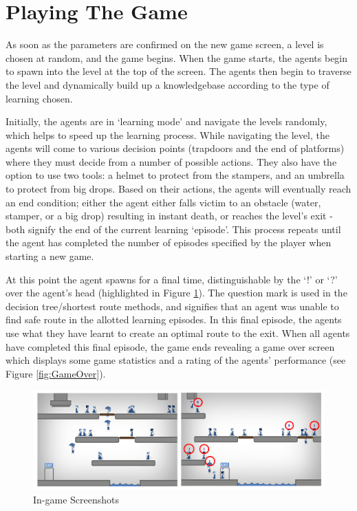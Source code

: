 \documentclass[a4paper,oneside]{report}
\begin{document}
\section{Playing The Game}

As soon as the parameters are confirmed on the new game screen, a level is chosen at random, and the game begins. When the game starts, the agents begin to spawn into the level at the top of the screen. The agents then begin to traverse the level and dynamically build up a knowledgebase according to the type of learning chosen. 

Initially, the agents are in `learning mode' and navigate the levels randomly, which helps to speed up the learning process. While navigating the level, the agents will come to various decision points (trapdoors and the end of platforms) where they must decide from a number of possible actions. They also have the option to use two tools: a helmet to protect from the stampers, and an umbrella to protect from big drops. Based on their actions, the agents will eventually reach an end condition; either the agent either falls victim to an obstacle (water, stamper, or a big drop) resulting in instant death, or reaches the level's exit - both signify the end of the current learning `episode'. This process repeats until the agent has completed the number of episodes specified by the player when starting a new game. 

At this point the agent spawns for a final time, distinguishable by the `!'  or `?' over the agent's head (highlighted in Figure \ref{fig:GameScreen}). The question mark is used in the decision tree/shortest route methods, and signifies that an agent was unable to find safe route in the allotted learning episodes. In this final episode, the agents use what they have learnt to create an optimal route to the exit. When all agents have completed this final episode, the game ends revealing a game over screen which displays some game statistics and a rating of the agents' performance (see Figure \ref{fig:GameOver}).

\begin{figure}[h!]
  \centering
    \includegraphics[width=140mm]{sources/images/Screen_Game}
    \caption{In-game Screenshots}
    \label{fig:GameScreen}
\end{figure}
\end{document}

